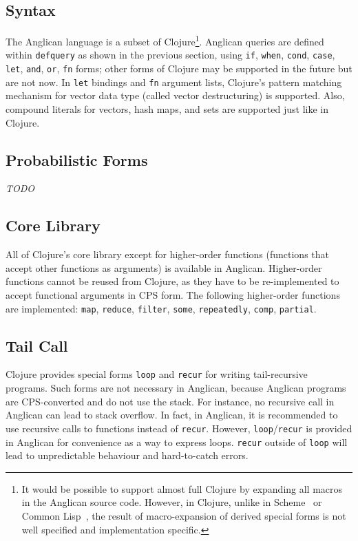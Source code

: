 \documentclass[preprint]{sigplanconf}
\begin{document}
\subsection{Syntax}

The Anglican language is a subset of Clojure\footnote{It would be
possible to support almost full Clojure by expanding all macros
in the Anglican source code. However, in Clojure, unlike in
Scheme~\cite{SDF+10} or Common Lisp~\cite{PC94}, the result
of macro-expansion of derived special forms is not well
specified and implementation specific.}.  Anglican queries
are defined within \texttt{defquery} as shown in the previous section,
using \texttt{if}, \texttt{when}, \texttt{cond}, \texttt{case},
\texttt{let}, \texttt{and}, \texttt{or}, \texttt{fn} forms;
other forms of Clojure may be supported in the future but are not now.
In \texttt{let} bindings and \texttt{fn} argument lists,
Clojure's pattern matching mechanism for vector data type
(called vector destructuring) is supported. Also, compound
literals for vectors, hash maps, and
sets are supported just like in Clojure.

\subsection{Probabilistic Forms}

{\it TODO}

\subsection{Core Library}
\label{sec:core}

All of Clojure's core library except for higher-order functions
(functions that accept other functions as arguments) is
available in Anglican. Higher-order functions cannot be reused
from Clojure, as they have to be re-implemented to accept
functional arguments in CPS form. The following higher-order
functions are implemented: \texttt{map}, \texttt{reduce},
\texttt{filter}, \texttt{some}, \texttt{repeatedly},
\texttt{comp}, \texttt{partial}.

\subsection{Tail Call}
\label{sec:tail}

Clojure provides special forms \texttt{loop} and \texttt{recur}
for writing tail-recursive programs. Such forms are not necessary
in Anglican, because Anglican programs are CPS-converted and do
not use the stack. For instance, no recursive call in Anglican
can lead to stack overflow.  In fact, in Anglican, it is
recommended to use recursive calls to functions instead of
\texttt{recur}. However, \texttt{loop}/\texttt{recur} is
provided in Anglican for convenience as a way to express loops.
\texttt{recur} outside of \texttt{loop} will lead to
unpredictable behaviour and hard-to-catch errors.
\end{document}
